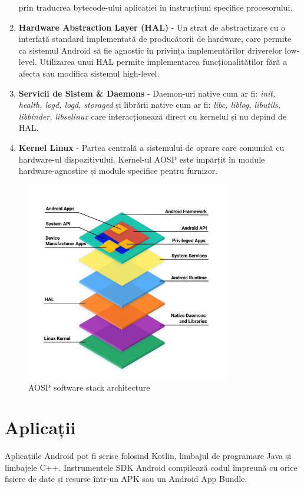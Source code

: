 \documentclass[12pt,a4paper]{report}
\begin{document}
\begin{enumerate}
    prin traducrea bytecode-ului aplicației în instrucțiuni specifice procesorului.
    \item \textbf{Hardware Abstraction Layer (HAL)} - Un strat de abstractizare cu o interfață standard implementată de producătorii de hardware, 
    care permite ca sistemul Android să fie agnostic în privința implementărilor driverelor low-level. Utilizarea unui HAL permite implementarea 
    funcționalităților fără a afecta sau modifica sistemul high-level.
    \item \textbf{Servicii de Sistem \& Daemons} - Daemon-uri native cum ar fi: \textit{init, health, logd, logd, storaged} 
    și librării native cum ar fi: \textit{libc, liblog, libutils, libbinder, libselinux}
    care interacționează direct cu kernelul și nu depind de HAL.
    \item \textbf{Kernel Linux} - Partea centrală a sistemului de oprare care comunică cu hardware-ul dispozitivului.
    Kernel-ul AOSP este impărțit în module hardware-agnostice și module specifice pentru furnizor.
\end{enumerate}
\begin{figure}[h]
    \centering
    \includegraphics[width=0.8\textwidth]{android_stack.png}
    \caption{AOSP software stack architecture \cite{android-architecture}}
    \label{fig:android_stack}
\end{figure}
\section{Aplicații}
Aplicațiile Android pot fi scrise folosind Kotlin, limbajul de programare Java și limbajele C++. 
Instrumentele SDK Android compilează codul împreună cu orice fișiere de date și resurse într-un APK sau un Android App Bundle.\cite{android-application-fundamentals}
\end{document}
